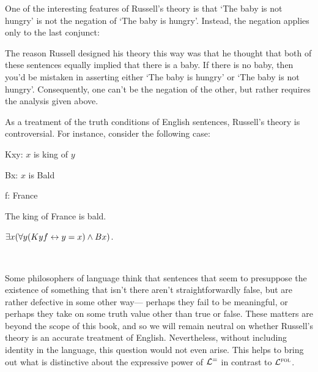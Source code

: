 One of the interesting features of Russell's theory is that `The baby is not hungry' is not the negation of `The baby is hungry'.
Instead, the negation applies only to the last conjunct:

\begin{earg}
\end{earg}

The reason Russell designed his theory this way was that he thought that both of these sentences equally implied that there is a baby.
If there is no baby, then you'd be mistaken in asserting either `The baby is hungry' or `The baby is not hungry'.
Consequently, one can't be the negation of the other, but rather requires the analysis given above.

As a treatment of the truth conditions of English sentences, Russell's theory is controversial.
For instance, consider the following case:
\begin{multicols}{2}
  \begin{ekey}
    \item[Kxy:] $x$ is king of $y$
    \item[Bx:] $x$ is Bald
    \item[f:] France
  \end{ekey}

  \columnbreak

  \begin{earg}
    \item[\ex{Def4}] The king of France is bald.
    \item[\ex{Def5}] $\exists x (\forall y (Kyf \leftrightarrow y = x) \wedge Bx)$.
    \item[] ~
  \end{earg}
\end{multicols}
Some philosophers of language think that sentences that seem to presuppose the existence of something that isn't there aren't straightforwardly false, but are rather defective in some other way--- perhaps they fail to be meaningful, or perhaps they take on some truth value other than true or false.
These matters are beyond the scope of this book, and so we will remain neutral on whether Russell's theory is an accurate treatment of English.
Nevertheless, without including identity in the language, this question would not even arise.
This helps to bring out what is distinctive about the expressive power of $\mathcal{L}^{=}$ in contrast to $\mathcal{L}^{\textsc{fol}}$. 







